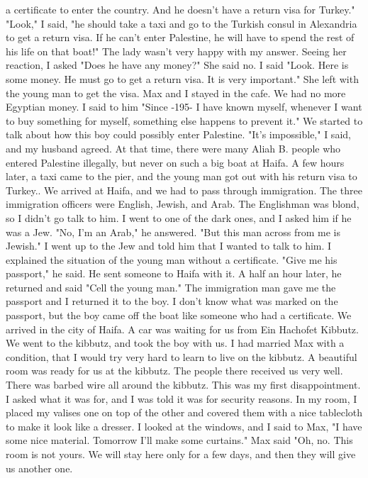 a certificate to enter the country.
And he doesn't have a return visa for Turkey."
"Look," I said, "he should take a taxi and go to the Turkish consul in Alexandria to 
get a return visa.
If he can't enter Palestine, he will have to spend the rest of his life 
on that boat!"
The lady wasn't very happy with my answer.
Seeing her reaction, I asked "Does he have  
any money?"
She said no.
I said "Look.
Here is some money.
He must go to get a return visa.
It is very important."
She left with the young man to get the visa.
Max and I stayed in the cafe.
We had no more Egyptian money.
I said to him "Since 
-195- 
I have known myself, whenever I want to buy something for myself, something else happens to prevent it."
We started to talk about how this boy could possibly enter Palestine.
"It's impossible," I said, and my husband agreed.
At that time, there were 
many Aliah B. people who entered Palestine illegally, but never on such a big boat 
at Haifa.
A few hours later, a taxi came to the pier, and the young man got out with 
his return visa to Turkey.. 
We arrived at Haifa, and we had to pass through immigration.
The three immigration officers were English, Jewish, and Arab.
The Englishman was blond, so I didn't 
go talk to him.
I went to one of the dark ones, and I asked him if he was a Jew.
"No, I'm an Arab," he answered.
"But this man across from me is Jewish."
I went up to the Jew and told him that I wanted to talk to him.
I explained the 
situation of the young man without a certificate.
"Give me his passport," he said.
He sent someone to Haifa with it.
A half an 
hour later, he returned and said "Cell the young man."
The immigration man gave me 
the passport and I returned it to the boy.
I don't know what was marked on the passport, but the boy came off the boat like someone who had a certificate.
We arrived in the city of Haifa.
A car was waiting for us from Ein Hachofet 
Kibbutz.
We went to the kibbutz, and took the boy with us.
I 
had married Max with a condition, that I would try very hard to learn to live on the 
kibbutz.
A beautiful room was ready for us at the kibbutz.
The people there 
received us very well.
There was barbed wire all around the kibbutz.
This was my first disappointment.
I asked what it was for, and I was 
told it was for security reasons.
In my room, I placed my valises one on top of the other and covered 
them with a nice tablecloth to make it look like a dresser.
I looked at 
the windows, and I said to Max, "I have some nice material.
Tomorrow 
I'll make some curtains."
Max said "Oh, no.
This room is not yours.
We will stay here only for a few days, and then they will give us another one.
